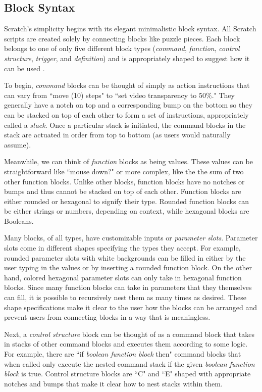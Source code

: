 \subsection{Block Syntax}

Scratch's simplicity begins with its elegant minimalistic block syntax. All Scratch scripts are created solely by connecting blocks like puzzle pieces. Each block belongs to one of only five different block types (\emph{command}, \emph{function}, \emph{control structure}, \emph{trigger}, and \emph{definition}) and is appropriately shaped to suggest how it can be used \cite{Maloney}.

To begin, \emph{command} blocks can be thought of simply as action instructions that can vary from ``move (10) steps" to ``set video transparency to 50\%." They generally have a notch on top and a corresponding bump on the bottom so they can be stacked on top of each other to form a set of instructions, appropriately called a \emph{stack}. Once a particular stack is initiated, the command blocks in the stack are actuated in order from top to bottom (as users would naturally assume).

Meanwhile, we can think of \emph{function} blocks as being values. These values can be straightforward like ``mouse down?" or more complex, like the the sum of two other function blocks. Unlike other blocks, function blocks have no notches or bumps and thus cannot be stacked on top of each other. Function blocks are either rounded or hexagonal to signify their type. Rounded function blocks can be either strings or numbers, depending on context, while hexagonal blocks are Booleans. 

Many blocks, of all types, have customizable inputs or \emph{parameter slots}. Parameter slots come in different shapes specifying the types they accept. For example, rounded parameter slots with white backgrounds can be filled in either by the user typing in the values or by inserting a rounded function block. On the other hand, colored hexagonal parameter slots can only take in hexagonal function blocks. Since many function blocks can take in parameters that they themselves can fill, it is possible to recursively nest them as many times as desired. These shape specifications make it clear to the user how the blocks can be arranged and prevent users from connecting blocks in a way that is meaningless.

Next, a \emph{control structure} block can be thought of as a command block that takes in stacks of other command blocks and executes them according to some logic. For example, there are ``if \emph{boolean function block} then" command blocks that when called only execute the nested command stack if the given \emph{boolean function block} is true. Control structure blocks are ``C" and ``E" shaped with appropriate notches and bumps that make it clear how to nest stacks within them.

